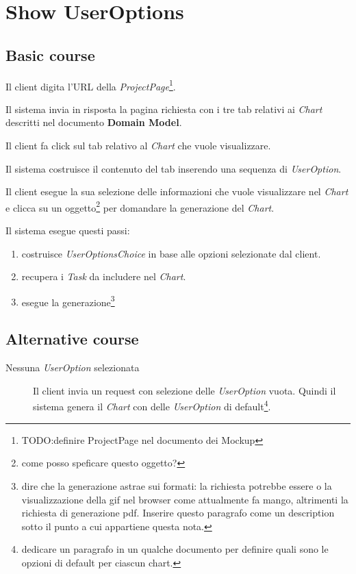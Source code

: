 \section{Show UserOptions}
\label{seq:showUserOptions}
\subsection{Basic course}
Il client digita l'URL della \emph{ProjectPage}\footnote{TODO:definire
ProjectPage nel documento dei Mockup}. 

Il sistema invia in risposta la pagina richiesta con i tre tab relativi ai
\emph{Chart} descritti nel documento \textbf{Domain Model}. 

Il client fa click sul tab relativo al \emph{Chart} che vuole visualizzare.

Il sistema costruisce il contenuto del tab inserendo una sequenza di
\emph{UserOption}. 

Il client esegue la sua selezione delle informazioni che
vuole visualizzare nel \emph{Chart} e clicca su un oggetto\footnote{come posso
speficare questo oggetto?} per domandare la generazione del \emph{Chart}.

Il sistema esegue questi passi:
\begin{enumerate}
  \item costruisce \emph{UserOptionsChoice} in base alle opzioni selezionate
  dal client.
  \item recupera i \emph{Task} da includere nel \emph{Chart}.
  \item esegue la generazione\footnote{dire che la generazione astrae sui
  formati: la richiesta potrebbe essere o la visualizzazione della gif nel
  browser come attualmente fa mango, altrimenti la richiesta di generazione
  pdf. Inserire questo paragrafo come un description sotto il punto a cui
  appartiene questa nota.}
\end{enumerate}

\subsection{Alternative course}
\begin{description}
\item[Nessuna \emph{UserOption} selezionata] Il client invia un request con 
selezione delle \emph{UserOption} vuota. Quindi il sistema genera il
\emph{Chart} con delle \emph{UserOption} di default\footnote{dedicare un
paragrafo in un qualche documento per definire quali sono le opzioni di
default per ciascun chart.}.
\end{description}